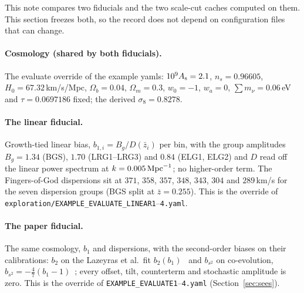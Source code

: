 \documentclass[11pt]{article}
\newcommand{\us}{\_\allowbreak}
\begin{document}
This note compares two fiducials and the two scale-cut caches
computed on them.  This section freezes both, so the record does not
depend on configuration files that can change.

\paragraph{Cosmology (shared by both fiducials).}
The evaluate override of the example yamls: $10^9 A_{\rm s} = 2.1$,
$n_s = 0.96605$, $H_0 = 67.32$\,km/s/Mpc, $\Omega_b = 0.04$,
$\Omega_m = 0.3$, $w_0 = -1$, $w_a = 0$, $\sum m_\nu = 0.06$\,eV and
$\tau = 0.0697186$ fixed; the derived $\sigma_8 = 0.8278$.

\paragraph{The linear fiducial.}
Growth-tied linear bias, $b_{1,i} = B_g/D(\bar{z}_i)$ per bin, with
the group amplitudes $B_g = 1.34$ (BGS), $1.70$ (LRG1--LRG3) and
$0.84$ (ELG1, ELG2) and $D$ read off the linear power spectrum at
$k = 0.005\,{\rm Mpc}^{-1}$; no higher-order term.  The
Fingers-of-God dispersions sit at $371$, $358$, $357$, $348$, $343$,
$304$ and $289$\,km/s for the seven dispersion groups (BGS split at
$\bar{z} = 0.255$).  This is the override of
\texttt{exploration/EXAMPLE\us EVALUATE\us LINEAR1}--\texttt{4.yaml}.

\paragraph{The paper fiducial.}
The same cosmology, $b_1$ and dispersions, with the second-order
biases on their calibrations: $b_2$ on the Lazeyras et al.\ fit
$b_2(b_1)$~\cite{Lazeyras2016} and $b_{s^2}$ on co-evolution,
$b_{s^2} = -\tfrac{4}{7}(b_1 - 1)$~\cite{Baldauf2012}; every offset,
tilt, counterterm and stochastic amplitude is zero.  This is the
override of \texttt{EXAMPLE\us EVALUATE1}--\texttt{4.yaml}
(Section~\ref{sec:sees}).
\end{document}
